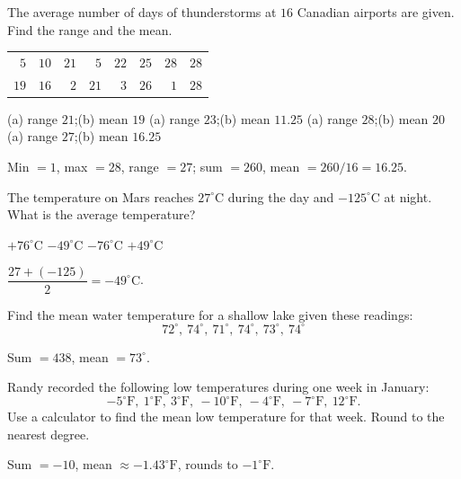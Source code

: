 \question[5]
The average number of days of thunderstorms at $16$ Canadian airports are given. Find the range and the mean.
\begin{center}
  \small
  \begin{tabular}{rrrrrrrr}
    $5$ & $10$ & $21$ & $5$ & $22$ & $25$ & $28$ & $28$ \\
    $19$ & $16$ & $2$ & $21$ & $3$ & $26$ & $1$ & $28$ \\
  \end{tabular}
\end{center}
\begin{choices}
  \choice (a) range $21$;\quad (b) mean $19$
  \choice (a) range $23$;\quad (b) mean $11.25$
  \choice (a) range $28$;\quad (b) mean $20$
  \CorrectChoice (a) range $27$;\quad (b) mean $16.25$
\end{choices}
\begin{solution}
  Min $=1$, max $=28$, range $=27$; sum $=260$, mean $=260/16=16.25$.
\end{solution}

\question[5]
The temperature on Mars reaches $27^{\circ}\mathrm{C}$ during the day and $-125^{\circ}\mathrm{C}$ at night. What is the average temperature?
\begin{choices}
  \choice $+76^{\circ}\mathrm{C}$
  \CorrectChoice $-49^{\circ}\mathrm{C}$
  \choice $-76^{\circ}\mathrm{C}$
  \choice $+49^{\circ}\mathrm{C}$
\end{choices}
\begin{solution}
  $\dfrac{27+(-125)}{2}=-49^{\circ}\mathrm{C}$.
\end{solution}


\newpage


\question[5]
Find the mean water temperature for a shallow lake given these readings:
\[
  72^{\circ},\ 74^{\circ},\ 71^{\circ},\ 74^{\circ},\ 73^{\circ},\ 74^{\circ}
\]
\begin{solution}
  Sum $=438$, mean $=73^{\circ}$.
\end{solution}

\question[5]
Randy recorded the following low temperatures during one week in January:
\[
  -5^{\circ}\mathrm{F},\ 1^{\circ}\mathrm{F},\ 3^{\circ}\mathrm{F},\ -10^{\circ}\mathrm{F},\ -4^{\circ}\mathrm{F},\ -7^{\circ}\mathrm{F},\ 12^{\circ}\mathrm{F}\text{.}
\]
Use a calculator to find the mean low temperature for that week. Round to the nearest degree.
\begin{solution}
  Sum $=-10$, mean $\approx -1.43^{\circ}\mathrm{F}$, rounds to $-1^{\circ}\mathrm{F}$.
\end{solution}


